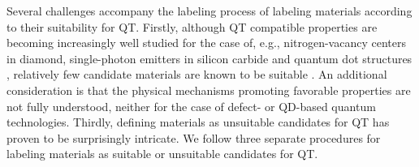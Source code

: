 \documentclass[superscriptaddress,unsortedaddress,
 amsmath,amssymb,
 aps,
]{revtex4-2}
\begin{document}
Several challenges accompany the labeling process of labeling materials according to their suitability for QT. 
Firstly, although QT compatible properties are becoming increasingly well studied for the case of, e.g., nitrogen-vacancy centers in diamond, single-photon emitters in silicon carbide and quantum dot structures \cite{Doherty_2013,Bathen2021,Aharonovich_2016}, relatively few candidate materials are known to be suitable \cite{Atatuere2018,Zhang2020}. An additional consideration is that the physical mechanisms promoting favorable properties are not fully understood, neither for the case of defect- or QD-based quantum technologies. Thirdly, defining materials as unsuitable candidates for QT has proven to be surprisingly intricate. 
We follow three separate procedures for labeling materials as suitable or unsuitable candidates for QT. 
\end{document}
